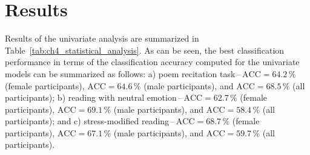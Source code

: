 \section{Results}
\label{ch4_4}

Results of the univariate analysis are summarized in Table~\ref{tab:ch4_statistical_analysis}. As can be seen, the best classification performance in terms of the classification accuracy computed for the univariate models can be summarized as follows: a) poem recitation task\,--\,$\mbox{ACC}=64.2\,\%$ (female participants), $\mbox{ACC}=64.6\,\%$ (male participants), and $\mbox{ACC}=68.5\,\%$ (all participants); b) reading with neutral emotion\,--\,$\mbox{ACC}=62.7\,\%$ (female participants), $\mbox{ACC}=69.1\,\%$ (male participants), and $\mbox{ACC}=58.4\,\%$ (all participants); and c) stress-modified reading\,--\,$\mbox{ACC}=68.7\,\%$ (female participants), $\mbox{ACC}=67.1\,\%$ (male participants), and $\mbox{ACC}=59.7\,\%$ (all participants).

